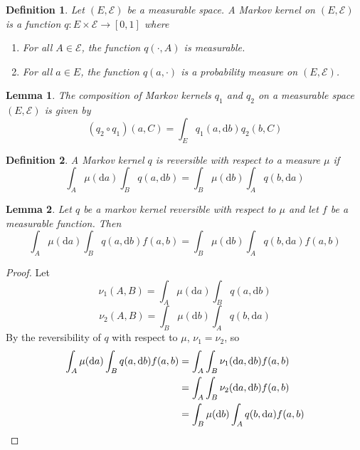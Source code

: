 \documentclass[english,twoside,openright]{HYgraduMLDS}
\newtheorem{lemma}{Lemma}
\newtheorem{definition}{Definition}
\newcommand{\R}{\mathbb{R}}
\newcommand{\dx}{\mathrm{d}}
\begin{document}

\begin{definition}
	Let \((E, \mathcal{E})\) be a measurable space. A Markov kernel on
  \((E, \mathcal{E})\) is a function \(q\colon E\times \mathcal{E}\to [0, 1]\)
  where
  \begin{enumerate}
    \item For all \(A\in \mathcal{E}\), the function \(q(\cdot, A)\) is
          measurable.
    \item
          For all \(a\in E\), the function \(q(a, \cdot)\) is a probability
          measure on \((E, \mathcal{E})\).
  \end{enumerate}
\end{definition}

\begin{lemma}\label{markov_kernel_composition_lemma}
	The composition of Markov kernels \(q_{1}\) and \(q_{2}\) on a measurable space
  \((E, \mathcal{E})\) is given by
  \[
    (q_{2}\circ q_{1})(a, C) = \int_{E}q_{1}(a, \dx b)q_{2}(b, C)
  \]
\end{lemma}

\begin{definition}
	A Markov kernel \(q\) is reversible with respect to a measure \(\mu\)
  if
  \[
    \int_{A}\mu(\dx a)\int_{B}q(a, \dx b) = \int_{B}\mu(\dx b)\int_{A}q(b, \dx a)
  \]
\end{definition}

\begin{lemma}\label{reversible_integration_lemma}
  Let \(q\) be a markov kernel reversible with respect to \(\mu\) and
  let \(f\) be a measurable function. Then
  \[
    \int_{A}\mu(\dx a)\int_{B}q(a, \dx b)f(a, b)
    = \int_{B}\mu(\dx b)\int_{A}q(b, \dx a)f(a, b)
  \]
\end{lemma}
\begin{proof}
	Let
  \[
    \nu_{1}(A, B) = \int_{A}\mu(\dx a)\int_{B}q(a, \dx b)
  \]
  \[
    \nu_{2}(A, B) = \int_{B}\mu(\dx b)\int_{A}q(b, \dx a)
  \]
  By the reversibility of \(q\) with respect to \(\mu\),
  \(\nu_{1} = \nu_{2}\), so
  \begin{align*}
    \int_{A}\mu(\dx a)\int_{B}q(a, \dx b)f(a, b)
    &= \int_{A}\int_{B}\nu_{1}(\dx a, \dx b)f(a, b)
    \\&= \int_{A}\int_{B}\nu_{2}(\dx a, \dx b)f(a, b)
    \\&= \int_{B}\mu(\dx b)\int_{A}q(b, \dx a)f(a, b)
    \qedhere
  \end{align*}
\end{proof}
\end{document}
